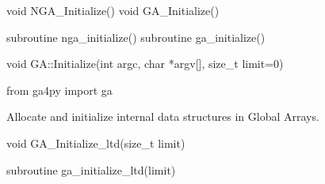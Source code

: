 \documentclass[10pt]{article}
\begin{document}

\begin{capi}
\begin{ccode}
void NGA_Initialize()
void GA_Initialize()
\end{ccode}
\end{capi}

\begin{fapi}
\begin{fcode}
subroutine nga_initialize()
subroutine ga_initialize()
\end{fcode}
\end{fapi}

\begin{cxxapi}
\begin{cxxcode}
void GA::Initialize(int argc, char *argv[], size_t limit=0)
\end{cxxcode}
\begin{funcargs}
\end{funcargs}
\end{cxxapi}

\begin{pyapi}
\begin{pycode}
from ga4py import ga
\end{pycode}
\end{pyapi}

\gcoll

\begin{desc}

Allocate and initialize internal data structures in Global Arrays.

\end{desc}



\begin{capi}
\begin{ccode}
void GA_Initialize_ltd(size_t limit)
\end{ccode}
\begin{funcargs}
\end{funcargs}
\end{capi}

\begin{fapi}
\begin{fcode}
subroutine ga_initialize_ltd(limit)
\end{fcode}
\begin{funcargs}
\end{funcargs}
\end{fapi}
\end{document}
